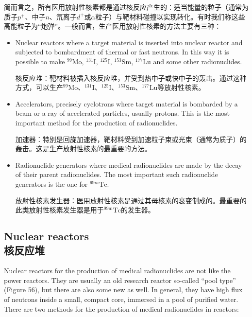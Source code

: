 \documentclass[dvipsnames, svgnames,a4paper,11pt]{article}
\begin{document}
简而言之，所有医用放射性核素都是通过核反应产生的：适当能量的粒子（通常为质子$p^+$、中子$n$、氘离子$d^+$或$\alpha$粒子）与靶材料碰撞以实现转化。有时我们称这些高能粒子为“炮弹”。一般而言，生产医用放射性核素的方法主要有三种：

\begin{itemize}
      \item Nuclear reactors where a target material is inserted into nuclear reactor and subjected to bombardment of thermal or fast neutrons. In this way it is possible to make $^{99}\mathrm{Mo}$, $^{131}\mathrm{I}$, $^{125}\mathrm{I}$, $^{153}\mathrm{Sm}$, $^{177}\mathrm{Lu}$ and some other radionuclides.

            核反应堆：靶材料被插入核反应堆，并受到热中子或快中子的轰击。通过这种方式，可以生产$^{99}\mathrm{Mo}$、$^{131}\mathrm{I}$、$^{125}\mathrm{I}$、$^{153}\mathrm{Sm}$、$^{177}\mathrm{Lu}$等放射性核素。

      \item Accelerators, precisely cyclotrons where target material is bombarded by a beam or a ray of accelerated particles, usually protons. This is the most important method for the production of radionuclides.

            加速器：特别是回旋加速器，靶材料受到加速粒子束或光束（通常为质子）的轰击。这是生产放射性核素的最重要的方法。

            
      \item Radionuclide generators where medical radionuclides are made by the decay of their parent radionuclides. The most important such radionuclide generators is the one for $^{99m}\mathrm{Tc}$.

            放射性核素发生器：医用放射性核素是通过其母核素的衰变制成的。最重要的此类放射性核素发生器是用于$^\text{99m}\mathrm{Tc}$的发生器。
\end{itemize}

\subsection{Nuclear reactors\\ 核反应堆}

Nuclear reactors for the production of medical radionuclides are not like the power reactors. They are usually an old research reactor so-called “pool type” (Figure 56), but there are also some new as well. In general, they have high flux of neutrons inside a small, compact core, immersed in a pool of purified water. There are two methods for the production of medical radionuclides in reactors:
\end{document}

